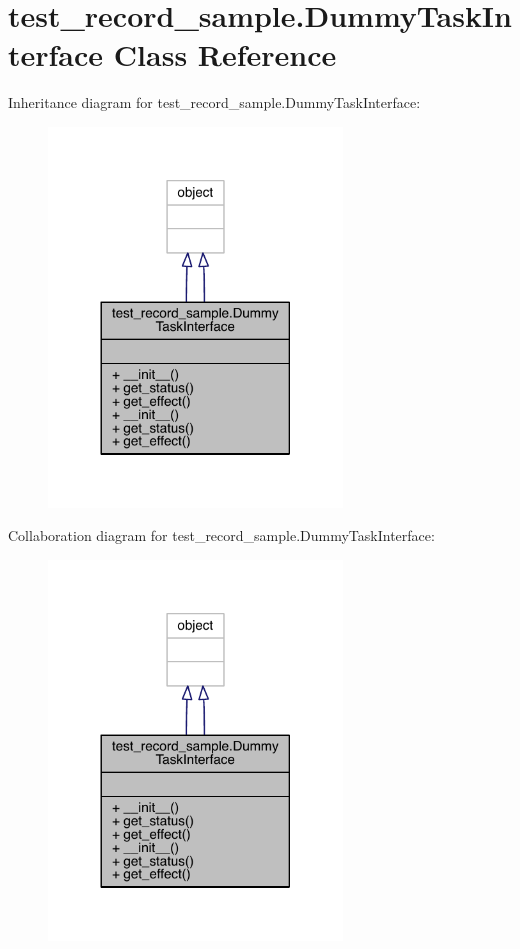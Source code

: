 \hypertarget{classtest__record__sample_1_1_dummy_task_interface}{}\section{test\+\_\+record\+\_\+sample.\+Dummy\+Task\+Interface Class Reference}
\label{classtest__record__sample_1_1_dummy_task_interface}


Inheritance diagram for test\+\_\+record\+\_\+sample.\+Dummy\+Task\+Interface\+:\nopagebreak
\begin{figure}[H]
\begin{center}
\leavevmode
\includegraphics[width=221pt]{classtest__record__sample_1_1_dummy_task_interface__inherit__graph}
\end{center}
\end{figure}


Collaboration diagram for test\+\_\+record\+\_\+sample.\+Dummy\+Task\+Interface\+:\nopagebreak
\begin{figure}[H]
\begin{center}
\leavevmode
\includegraphics[width=221pt]{classtest__record__sample_1_1_dummy_task_interface__coll__graph}
\end{center}
\end{figure}
